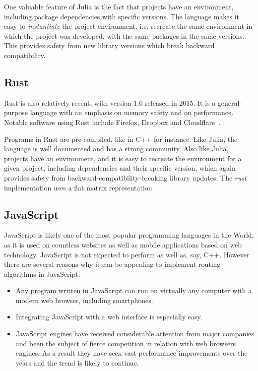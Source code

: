 \documentclass[11pt,a4paper,notitlepage]{article}
\begin{document}
One valuable feature of Julia is the fact that projects have an
environment, including package dependencies with specific
versions. The language makes it easy to \emph{instantiate} the
project environment, i.e. recreate the same environment in which the
project was developed, with the same packages in the same
versions. This provides safety from new library versions which break
backward compatibility.

\subsection{Rust}
Rust is also relatively recent, with version 1.0 released in 2015. It
is a general-purpose language with an emphasis on memory safety and
on performance. Notable software using Rust include Firefox, Dropbox
and Cloudflare~\cite{rust-lang}.

Programs in Rust are pre-compiled, like in C++ for
instance. Like Julia, the language is well documented and has a strong
community. Also like Julia, projects have an environment, and it is
easy to recreate the environment for a given project, including
dependencies and their specific version, which again provides safety
from backward-compatibility-breaking library updates. The \emph{rust}
implementation uses a flat matrix representation.

\subsection{JavaScript}
JavaScript is likely one of the most popular programming languages in
the World, as it is used on countless websites as well as mobile
applications based on web technology. JavaScript is not expected to
perform as well as, say, C++. However there are several reasons why it
can be appealing to implement routing algorithms in JavaScript:
\begin{itemize}
\item Any program written in JavaScript can run on virtually any
  computer with a modern web browser, including smartphones.
\item Integrating JavaScript with a web interface is especially easy.
\item JavaScript engines have received considerable attention from
  major companies and been the subject of fierce competition in
  relation with web browsers engines. As a result they have seen vast
  performance improvements over the years and the trend is likely to continue.
\end{itemize}
\end{document}
